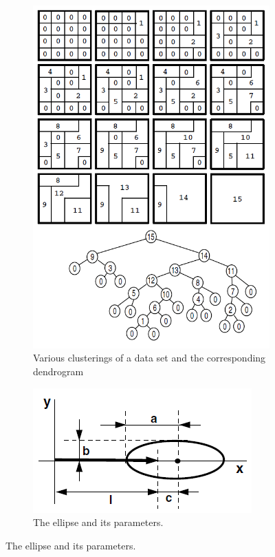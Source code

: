 \begin{figure}[h]
\centering
	\begin{subfigure}{0.5\textwidth}
	\includegraphics[width=\textwidth]{./img/telea-hierarchical_clustering.PNG}
    \caption{Various clusterings of a data set and the corresponding dendrogram}
	\end{subfigure}
    \qquad
    \begin{subfigure}{0.3\textwidth}
	\includegraphics[width=\textwidth]{./img/telea-ellipse-params.PNG}
    \caption{The ellipse and its parameters.}
    

\end{subfigure}
\end{figure}
